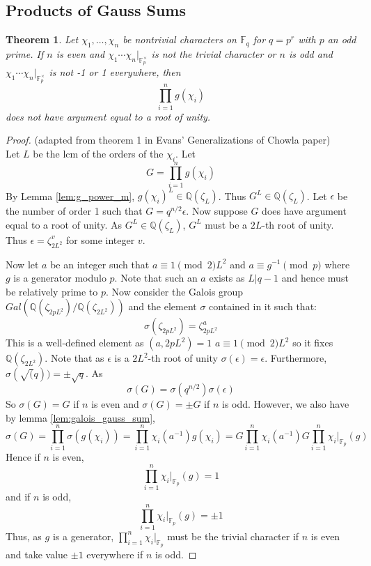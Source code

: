 \documentclass{article}
\newcommand{\Q}{\mathbb{Q}}
\newcommand{\F}{\mathbb{F}}
\newtheorem{theorem}{Theorem}[section]
\theoremstyle{definition}
\theoremstyle{definition}
\theoremstyle{remark}
\begin{document}
\subsection{Products of Gauss Sums}
\begin{theorem}
Let $\chi_1, \ldots, \chi_n$ be nontrivial characters on $\F_q$ for $q = p^r$ with $p$ an odd prime. If $n$ is even and $\chi_1\cdots \chi_n|_{\F_p^{\times}}$ is not the trivial character or $n$ is odd and $\chi_1\cdots \chi_n|_{\F_p^{\times}}$ is not -1 or 1 everywhere, then 
\[\prod_{i = 1}^n g(\chi_i)\]
does not have argument equal to a root of unity.
\end{theorem}
\begin{proof} (adapted from theorem 1 in Evans' Generalizations of Chowla paper)
\\
Let $L$ be the lcm of the orders of the $\chi_i$. Let 
\[G = \prod_{i = 1}^n g(\chi_i)\]
By Lemma \ref{lem:g_power_m},  $g(\chi_i)^L \in \Q(\zeta_L)$. Thus $G^L \in \Q(\zeta_L)$. Let $\epsilon$ be the number of order 1 such that $G = q^{n/2}\epsilon$. Now suppose $G$ does have argument equal to a root of unity. As $G^L \in \Q(\zeta_L)$, $G^L$ must be a $2L$-th root of unity. Thus $\epsilon = \zeta_{2L^2}^v$ for some integer $v$. 
\par
Now let $a$ be an integer such that $a \equiv 1 \pmod 2L^2$ and $a \equiv g^{-1} \pmod p$ where $g$ is a generator modulo $p$. Note that such an $a$ exists as $L | q-1$ and hence must be relatively prime to $p$. Now consider the Galois group $Gal(\Q(\zeta_{2pL^2})/\Q(\zeta_{2L^2}))$ and the element $\sigma$ contained in it such that:
\[\sigma(\zeta_{2pL^2}) = \zeta_{2pL^2}^a\]
This is a well-defined element as $(a,2pL^2) = 1$ $a \equiv 1 \pmod 2L^2$ so it fixes $\Q(\zeta_{2L^2})$. Note that as $\epsilon$ is a $2L^2$-th root of unity $\sigma(\epsilon) = \epsilon$. Furthermore, $\sigma(\sqrt(q)) = \pm \sqrt{q}$. As
\[\sigma(G) = \sigma(q^{n/2})\sigma(\epsilon)\]
So $\sigma(G) = G$ if $n$ is even and $\sigma(G) = \pm G$ if $n$ is odd. However, we also have by lemma \ref{lem:galois_gauss_sum},
\[\sigma(G) = \prod_{i = 1}^n \sigma(g(\chi_i)) = \prod_{i = 1}^n \chi_i(a^{-1})g(\chi_i) = G\prod_{i = 1}^n \chi_i(a^{-1}) G\prod_{i = 1}^n \chi_i|_{\F_p}(g)\]
Hence if $n$ is even,
\[\prod_{i = 1}^n \chi_i|_{\F_p}(g) = 1\]
and if $n$ is odd,
\[\prod_{i = 1}^n \chi_i|_{\F_p}(g) = \pm 1\]
Thus, as $g$ is a generator, $\prod_{i = 1}^n \chi_i|_{\F_p}$ must be the trivial character if $n$ is even and take value $\pm 1$ everywhere if $n$ is odd.
\end{proof}
\end{document}
